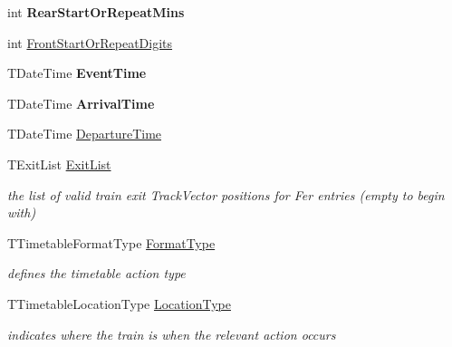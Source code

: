\begin{DoxyCompactItemize}
\mbox{\label{class_t_action_vector_entry_a18171f01d5e5e01242c3c672045efb28}} 
int {\bfseries Rear\+Start\+Or\+Repeat\+Mins}
\item 
int \mbox{\hyperlink{class_t_action_vector_entry_a8b84cb2a020cfb2f81a091f3bdc59ec4}{Front\+Start\+Or\+Repeat\+Digits}}
\item 
\mbox{\label{class_t_action_vector_entry_a07850a494d4c0c71e9579c21c1910b76}} 
T\+Date\+Time {\bfseries Event\+Time}
\item 
\mbox{\label{class_t_action_vector_entry_a590726f5c852a19625d7fdbed22469b0}} 
T\+Date\+Time {\bfseries Arrival\+Time}
\item 
T\+Date\+Time \mbox{\hyperlink{class_t_action_vector_entry_a37c6ff0cda2672bbd60099487442fbb5}{Departure\+Time}}
\item 
\mbox{\label{class_t_action_vector_entry_ab1d7c2bc6c0dee48c74c3dd9c325ec4d}} 
T\+Exit\+List \mbox{\hyperlink{class_t_action_vector_entry_ab1d7c2bc6c0dee48c74c3dd9c325ec4d}{Exit\+List}}
\begin{DoxyCompactList}\small\item\em the list of valid train exit Track\+Vector positions for \textquotesingle{}Fer\textquotesingle{} entries (empty to begin with) \end{DoxyCompactList}\item 
\mbox{\label{class_t_action_vector_entry_aaa45fd77d7d5f19350a0a7a8fbc05b13}} 
T\+Timetable\+Format\+Type \mbox{\hyperlink{class_t_action_vector_entry_aaa45fd77d7d5f19350a0a7a8fbc05b13}{Format\+Type}}
\begin{DoxyCompactList}\small\item\em defines the timetable action type \end{DoxyCompactList}\item 
\mbox{\label{class_t_action_vector_entry_a5de0c970525a897f8ac2cdf66004dab9}} 
T\+Timetable\+Location\+Type \mbox{\hyperlink{class_t_action_vector_entry_a5de0c970525a897f8ac2cdf66004dab9}{Location\+Type}}
\begin{DoxyCompactList}\small\item\em indicates where the train is when the relevant action occurs \end{DoxyCompactList}\item 

\end{DoxyCompactItemize}
